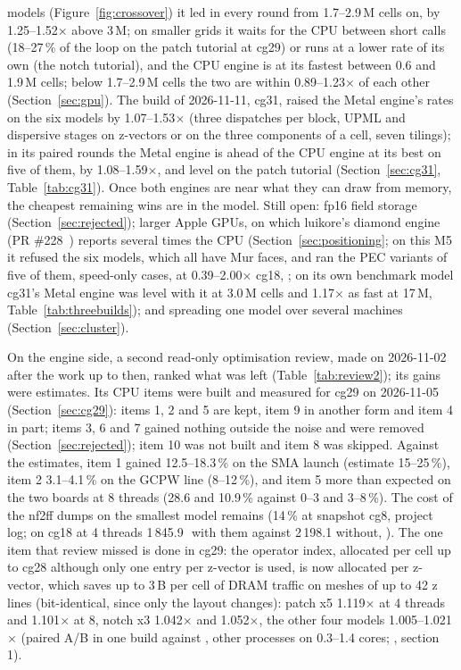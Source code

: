 models (Figure~\ref{fig:crossover}) it led in every round from 1.7--2.9\,M cells on, by 1.25--1.52$\times$ above
3\,M; on smaller grids it waits for the CPU between short calls (18--27\,\% of the loop on the patch tutorial at
cg29) or runs at a lower rate of its own (the notch tutorial), and the CPU engine is at its fastest between 0.6 and 1.9\,M cells; below 1.7--2.9\,M
cells the two are within 0.89--1.23$\times$ of each other (Section~\ref{sec:gpu}). The build of 2026-11-11, cg31,
raised the Metal engine's rates on the six models by 1.07--1.53$\times$ (three dispatches per block, UPML and
dispersive stages on z-vectors or on the three components of a cell, seven tilings); in its paired rounds the Metal
engine is ahead of the CPU engine at its best on five of them, by 1.08--1.59$\times$, and level on the patch tutorial
(Section~\ref{sec:cg31}, Table~\ref{tab:cg31}). Once both engines are near what they can draw from
memory, the cheapest remaining wins are in the model. Still open: fp16 field storage (Section~\ref{sec:rejected}); larger Apple GPUs, on which luikore's
diamond engine (PR \#228~\cite{luikore228}) reports several times the CPU (Section~\ref{sec:positioning}; on this M5
it refused the six models, which all have Mur faces, and ran the PEC variants of five of them, speed-only cases, at
0.39--2.00$\times$ cg18, ; on its own benchmark model cg31's Metal engine
was level with it at 3.0\,M cells and 1.17$\times$ as fast at 17\,M, Table~\ref{tab:threebuilds}); and spreading one
model over several machines (Section~\ref{sec:cluster}).

On the engine side, a second read-only optimisation review, made on 2026-11-02 after the work up to then, ranked what
was left (Table~\ref{tab:review2}); its gains were estimates. Its CPU items were built and measured for cg29 on
2026-11-05 (Section~\ref{sec:cg29}): items 1, 2 and 5 are kept, item 9 in another form and item 4 in part; items 3,
6 and 7 gained nothing outside the noise and were removed (Section~\ref{sec:rejected}); item 10 was not built and item
8 was skipped. Against the estimates, item 1 gained 12.5--18.3\,\% on the SMA launch (estimate 15--25\,\%), item 2
3.1--4.1\,\% on the GCPW line (8--12\,\%), and item 5 more than expected on the two boards at 8 threads (28.6 and
10.9\,\% against 0--3 and 3--8\,\%). The cost of the nf2ff dumps on the smallest model remains (14\,\% at snapshot
cg8, project log; on cg18 at 4 threads 1\,845.9\,\MC\ with them against 2\,198.1 without,
). The one item that review missed is done in cg29: the operator index,
allocated per cell up to cg28 although only one entry per z-vector is used, is now allocated per z-vector, which saves
up to 3\,B per cell of DRAM traffic on meshes of up to 42 z lines (bit-identical, since only the layout changes):
patch x5 1.119$\times$ at 4 threads and 1.101$\times$ at 8, notch x3 1.042$\times$ and 1.052$\times$, the other four
models 1.005--1.021$\times$ (paired A/B in one build against , other processes
on 0.3--1.4 cores; , section 1).

